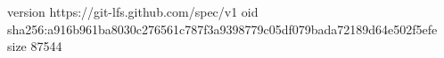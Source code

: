 version https://git-lfs.github.com/spec/v1
oid sha256:a916b961ba8030c276561c787f3a9398779c05df079bada72189d64e502f5efe
size 87544
